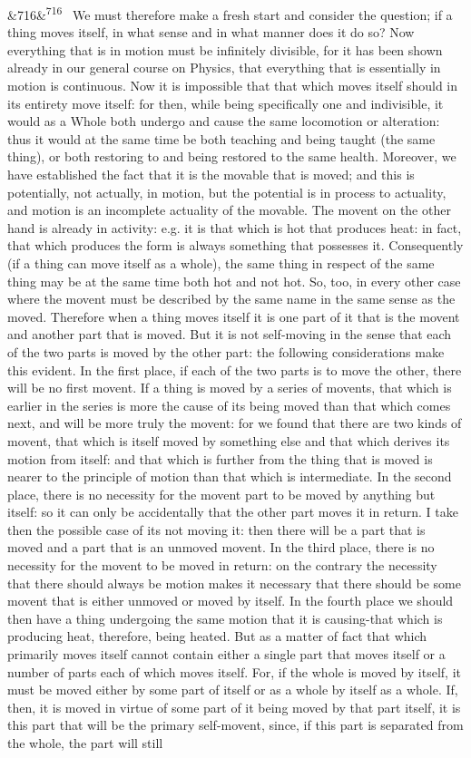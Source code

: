 \documentclass[12pt]{article}
\newcommand{\para}[1][]{\par\noindent\ifx&#1&\else\textsuperscript{\footnotesize #1}~\fi}
\begin{document}
\para[716] We must therefore make a fresh start and consider the question; if a thing moves itself, in what sense and in what manner does it do so? Now everything that is in motion must be infinitely divisible, for it has been shown already in our general course on Physics, that everything that is essentially in motion is continuous. Now it is impossible that that which moves itself should in its entirety move itself: for then, while being specifically one and indivisible, it would as a Whole both undergo and cause the same locomotion or alteration: thus it would at the same time be both teaching and being taught (the same thing), or both restoring to and being restored to the same health. Moreover, we have established the fact that it is the movable that is moved; and this is potentially, not actually, in motion, but the potential is in process to actuality, and motion is an incomplete actuality of the movable. The movent on the other hand is already in activity: e.g. it is that which is hot that produces heat: in fact, that which produces the form is always something that possesses it. Consequently (if a thing can move itself as a whole), the same thing in respect of the same thing may be at the same time both hot and not hot. So, too, in every other case where the movent must be described by the same name in the same sense as the moved. Therefore when a thing moves itself it is one part of it that is the movent and another part that is moved. But it is not self-moving in the sense that each of the two parts is moved by the other part: the following considerations make this evident. In the first place, if each of the two parts is to move the other, there will be no first movent. If a thing is moved by a series of movents, that which is earlier in the series is more the cause of its being moved than that which comes next, and will be more truly the movent: for we found that there are two kinds of movent, that which is itself moved by something else and that which derives its motion from itself: and that which is further from the thing that is moved is nearer to the principle of motion than that which is intermediate. In the second place, there is no necessity for the movent part to be moved by anything but itself: so it can only be accidentally that the other part moves it in return. I take then the possible case of its not moving it: then there will be a part that is moved and a part that is an unmoved movent. In the third place, there is no necessity for the movent to be moved in return: on the contrary the necessity that there should always be motion makes it necessary that there should be some movent that is either unmoved or moved by itself. In the fourth place we should then have a thing undergoing the same motion that it is causing-that which is producing heat, therefore, being heated. But as a matter of fact that which primarily moves itself cannot contain either a single part that moves itself or a number of parts each of which moves itself. For, if the whole is moved by itself, it must be moved either by some part of itself or as a whole by itself as a whole. If, then, it is moved in virtue of some part of it being moved by that part itself, it is this part that will be the primary self-movent, since, if this part is separated from the whole, the part will still 
\end{document}
